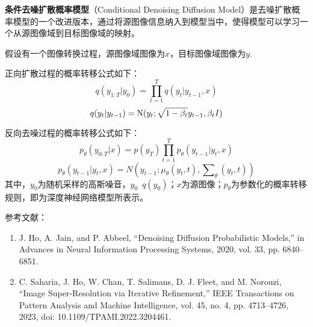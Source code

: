 
\textbf{条件去噪扩散概率模型}（Conditional Denoising Diffusion Model）是去噪扩散概率模型的一个改进版本，通过将源图像信息纳入到模型当中，使得模型可以学习一个从源图像域到目标图像域的映射。

假设有一个图像转换过程，源图像域图像为$x$，目标图像域图像为$y$.

正向扩散过程的概率转移公式如下：
\begin{equation}
q({y_{1:T}}|{y_0}) = \prod\limits_{t = 1}^T {q({y_t}|{y_{t - 1},x})}
\end{equation}
\begin{equation}
q({y_t}|{y_{t - 1}}) = {\rm{N}}({y_t};\sqrt {1 - {\beta _t}} {y_{t - 1}},{\beta _t}I)
\end{equation}

反向去噪过程的概率转移公式如下：
\begin{equation}
{p_\theta }({y_{0:T}|x}) = p({y_T})\prod\limits_{t = 1}^T {{p_\theta }({y_{t - 1}}|{y_t,x})}
\end{equation}
\begin{equation}
{p_\theta }({y_{t - 1}}|{y_t,x}) = N({y_{t - 1}};{\mu _\theta }({y_t},t),\sum\nolimits_\theta  {({y_t},t)} )
\end{equation}
其中，$y_0$为随机采样的高斯噪音，$y_0$~$q(y_0)$；$x$为源图像；$p_\theta$为参数化的概率转移规则，即为深度神经网络模型所表示。


参考文献：
\begin{enumerate}
\item J. Ho, A. Jain, and P. Abbeel, “Denoising Diffusion Probabilistic Models,” in Advances in Neural Information Processing Systems, 2020, vol. 33, pp. 6840–6851.
\item C. Saharia, J. Ho, W. Chan, T. Salimans, D. J. Fleet, and M. Norouzi, “Image Super-Resolution via Iterative Refinement,” IEEE Transactions on Pattern Analysis and Machine Intelligence, vol. 45, no. 4, pp. 4713–4726, 2023, doi: 10.1109/TPAMI.2022.3204461.
\end{enumerate}